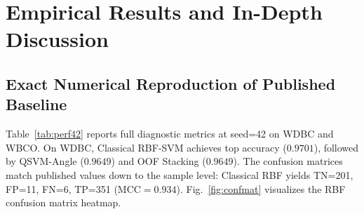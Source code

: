 \documentclass[journal,twocolumn]{IEEEtran}
\begin{document}
\section{Empirical Results and In-Depth Discussion}
\label{sec:results}

\subsection{Exact Numerical Reproduction of Published Baseline}
\label{sec:repro}

Table~\ref{tab:perf42} reports full diagnostic metrics at seed=42 on WDBC and WBCO. On WDBC, Classical RBF-SVM achieves top accuracy ($0.9701$), followed by QSVM-Angle ($0.9649$) and OOF Stacking ($0.9649$). The confusion matrices match published values down to the sample level: Classical RBF yields TN=201, FP=11, FN=6, TP=351 ($\text{MCC} = 0.934$). Fig.~\ref{fig:confmat} visualizes the RBF confusion matrix heatmap.
\end{document}
